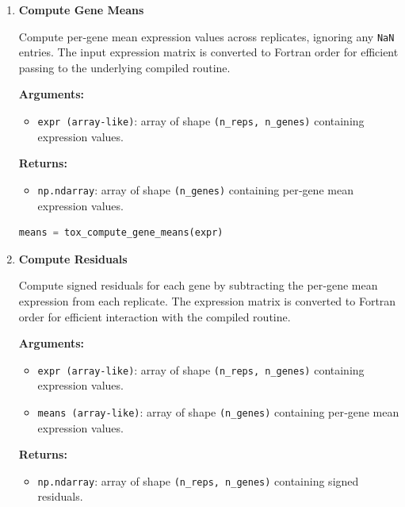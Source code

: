 \begin{enumerate}
    \item \textbf{Compute Gene Means}

        Compute per‑gene mean expression values across replicates, ignoring any \lstinline!NaN! entries.  
        The input expression matrix is converted to Fortran order for efficient passing to the underlying compiled routine.

        \textbf{Arguments:}
        \begin{itemize}
            \item \lstinline!expr (array-like)!: array of shape \lstinline!(n_reps, n_genes)! containing expression values.
        \end{itemize}

        \textbf{Returns:}
        \begin{itemize}
            \item \lstinline!np.ndarray!: array of shape \lstinline!(n_genes)! containing per‑gene mean expression values.
        \end{itemize}

        \begin{lstlisting}[language=Python, caption={Per‑Gene Mean Expression}]
means = tox_compute_gene_means(expr)
        \end{lstlisting}

    \item \textbf{Compute Residuals}

        Compute signed residuals for each gene by subtracting the per‑gene mean expression from each replicate.  
        The expression matrix is converted to Fortran order for efficient interaction with the compiled routine.

        \textbf{Arguments:}
        \begin{itemize}
            \item \lstinline!expr (array-like)!: array of shape \lstinline!(n_reps, n_genes)! containing expression values.
            \item \lstinline!means (array-like)!: array of shape \lstinline!(n_genes)! containing per‑gene mean expression values.
        \end{itemize}

        \textbf{Returns:}
        \begin{itemize}
            \item \lstinline!np.ndarray!: array of shape \lstinline!(n_reps, n_genes)! containing signed residuals.
        \end{itemize}


\end{enumerate}

